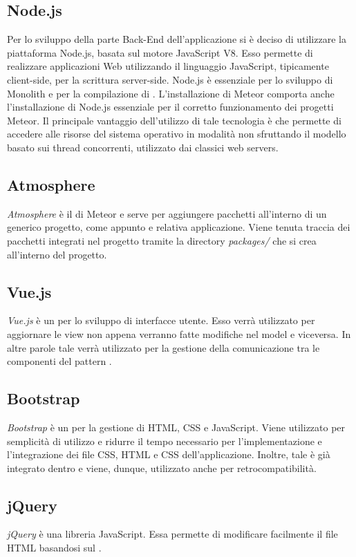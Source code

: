\subsection{Node.js}
Per lo sviluppo della parte Back-End dell’applicazione si è deciso di utilizzare la piattaforma  Node.js, basata sul motore JavaScript V8. Esso permette di realizzare applicazioni
Web utilizzando il linguaggio JavaScript, tipicamente client-side, per
la scrittura server-side. 
Node.js è essenziale per lo sviluppo di Monolith e per la compilazione di . L'installazione di Meteor comporta anche l'installazione di Node.js essenziale per il corretto funzionamento dei progetti Meteor. Il principale vantaggio dell'utilizzo di tale tecnologia è che permette di accedere alle risorse del sistema operativo in modalità  non sfruttando il modello basato sui thread concorrenti, utilizzato dai classici web servers.

\subsection{Atmosphere}
\textit{Atmosphere} è il  di Meteor e serve per aggiungere pacchetti  all'interno di un generico progetto, come appunto  e relativa applicazione. Viene tenuta traccia dei pacchetti integrati nel progetto tramite la directory \textit{packages/} che si crea all'interno del progetto.

\subsection{Vue.js}
\textit{Vue.js} è un  per lo sviluppo di interfacce utente. Esso verrà utilizzato per aggiornare le view non appena verranno fatte modifiche nel model e viceversa. In altre parole tale  verrà utilizzato per la gestione della comunicazione tra le componenti del pattern .

\subsection{Bootstrap}
\textit{Bootstrap} è un  per la gestione di HTML, CSS e JavaScript. Viene utilizzato per semplicità di utilizzo e ridurre il tempo necessario per l'implementazione e l'integrazione dei file CSS, HTML e CSS dell'applicazione. Inoltre, tale  è già integrato dentro  e viene, dunque, utilizzato anche per retrocompatibilità.

\subsection{jQuery}
\textit{jQuery} è una libreria JavaScript. Essa permette di modificare facilmente il file HTML basandosi sul .
